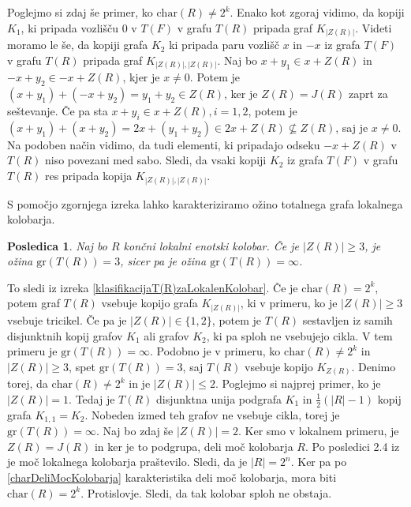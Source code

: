\documentclass[a4paper, 12pt]{amsart}
\theoremstyle{definition} %
\theoremstyle{plain} %
\newtheorem{posledica}[definicija]{Posledica}
\begin{document}
Poglejmo si zdaj še primer, ko $\textrm{char}(R) \neq 2^k$. Enako kot zgoraj vidimo, da kopiji $K_1$, ki pripada vozlišču $0$ v $T(F)$ v grafu $T(R)$ pripada graf $K_{|Z(R)|}$. Videti moramo le še, da kopiji grafa  $K_2$ ki pripada paru vozlišč $x$ in $-x$ iz grafa $T(F)$ v grafu $T(R)$ pripada graf $K_{|Z(R)|, |Z(R)|}$. Naj bo $x+ y_1\in x  + Z(R)$ in $-x + y_2\in -x + Z(R)$, kjer je $x\neq 0$. Potem je $(x+y_1) + (-x + y_2 ) = y_1 + y_2\in Z(R)$, ker je $Z(R) = J(R)$ zaprt za seštevanje. Če pa sta $x+y_i \in x + Z(R), i=1,2$, potem je $(x+y_1) + (x+y_2) = 2x + (y_1 + y_2) \in 2x + Z(R) \not\subseteq Z(R)$, saj je $x\neq 0$. Na podoben način vidimo, da tudi elementi, ki pripadajo odseku $-x + Z(R)$ v $T(R)$ niso povezani med sabo. Sledi, da vsaki kopiji $K_2$ iz grafa $T(F)$ v grafu $T(R)$ res pripada kopija $K_{|Z(R)|,|Z(R)|}$.
\endproof

S pomočjo zgornjega izreka lahko karakteriziramo ožino totalnega grafa lokalnega kolobarja.

\begin{posledica}
Naj bo $R$ končni lokalni enotski kolobar. Če je $|Z(R)| \ge 3$, je ožina $\textrm{gr}(T(R)) = 3$, sicer pa je ožina $\textrm {gr}(T(R)) = \infty$.
\end{posledica}

\proof
To sledi iz izreka \ref{klasifikacijaT(R)zaLokalenKolobar}. Če je $\textrm{char}(R) = 2^k$, potem graf $T(R)$ vsebuje kopijo grafa $K_{|Z(R)|}$, ki v primeru, ko je $|Z(R)| \ge 3$ vsebuje tricikel. Če pa je $|Z(R)| \in \{1,2\}$, potem je $T(R)$ sestavljen iz samih disjunktnih kopij grafov $K_1$ ali grafov $K_2$, ki pa sploh ne vsebujejo cikla. V tem primeru je $\textrm{gr}(T(R)) = \infty$. Podobno je v primeru, ko $\textrm{char}(R) \neq 2^k$ in $|Z(R)| \ge 3$, spet $\textrm{gr}(T(R)) = 3$, saj $T(R)$ vsebuje kopijo $K_{Z(R)}$. Denimo torej, da $\textrm{char}(R) \neq 2^k$ in je $|Z(R)| \le 2$. Poglejmo si najprej primer, ko je $|Z(R)| = 1$. Tedaj je $T(R)$ disjunktna unija podgrafa $K_1$ in $\frac{1}{2}(|R| - 1)$ kopij grafa $K_{1,1} = K_2$. Nobeden izmed teh grafov ne vsebuje cikla, torej je $\textrm{gr} (T(R)) = \infty$. Naj bo zdaj še $|Z(R)| = 2$. Ker smo v lokalnem primeru, je $Z(R) = J(R)$ in ker je to podgrupa, deli moč kolobarja $R$. Po posledici 2.4 iz \cite{diploma} je moč lokalnega kolobarja praštevilo. Sledi, da je $|R| = 2^n$. Ker pa po \ref{charDeliMocKolobarja} karakteristika deli moč kolobarja, mora biti $\textrm{char}(R) = 2^k$. Protislovje. Sledi, da tak kolobar sploh ne obstaja.
\endproof
\end{document}
